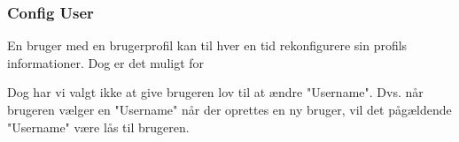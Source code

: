 \subsubsection{Config User}

En bruger med en brugerprofil kan til hver en tid rekonfigurere sin profils informationer. Dog er det muligt for 

 Dog har vi valgt ikke at give brugeren lov til at ændre "Username". Dvs. når brugeren vælger en "Username" når der oprettes en ny bruger, vil det pågældende "Username" være lås til brugeren. 